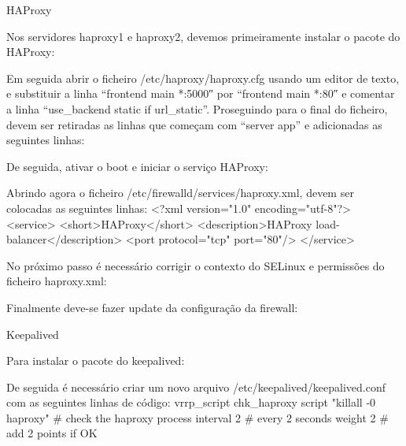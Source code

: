 HAProxy

Nos servidores haproxy1 e haproxy2, devemos primeiramente instalar o pacote do HAProxy:
 \par

Em seguida abrir o ficheiro /etc/haproxy/haproxy.cfg usando um editor de texto, e substituir a linha “frontend  main *:5000″ por “frontend  main *:80″ e comentar a linha “use_backend static if url_static”.
Proseguindo para o final do ficheiro, devem ser retiradas as linhas que começam com “server app” e adicionadas as seguintes linhas:
 \par
{} \par

De seguida, ativar o boot e iniciar o serviço HAProxy:
 \par
{} \par
{} \par

Abrindo agora o ficheiro /etc/firewalld/services/haproxy.xml, devem ser colocadas as seguintes linhas:
<?xml version="1.0" encoding="utf-8"?>
<service>
<short>HAProxy</short>
<description>HAProxy load-balancer</description>
<port protocol="tcp" port="80"/>
</service>

No próximo passo é necessário corrigir o contexto do SELinux e permissões do ficheiro haproxy.xml:
 \par
{} \par
{} \par

Finalmente deve-se fazer update da configuração da firewall:
 \par
{} \par

Keepalived

Para instalar o pacote do keepalived:
 \par

De seguida é necessário criar um novo arquivo /etc/keepalived/keepalived.conf com as seguintes linhas de código:
vrrp_script chk_haproxy {
  script "killall -0 haproxy" # check the haproxy process
  interval 2 # every 2 seconds
  weight 2 # add 2 points if OK
}

